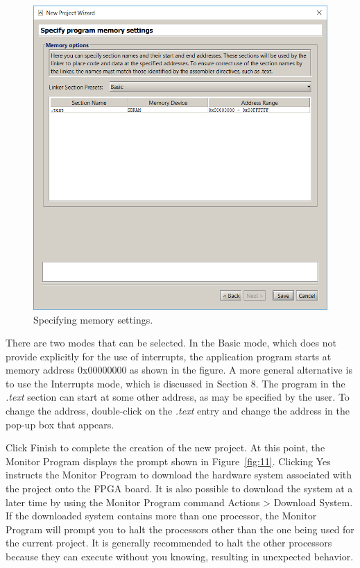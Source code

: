 \documentclass[11pt, twoside, pdftex]{article}
\begin{document}
\begin{enumerate}
\begin{figure}[H]
   \begin{center}
      \includegraphics[scale=0.5]{screenshots/figure10.png}
   \end{center}
   \caption{Specifying memory settings.} 
	 \label{fig:10}
\end{figure}

There are two modes that can be selected. In the {\sf Basic}
mode, which does not provide explicitly for the use of
interrupts, the application program starts at memory address
0x00000000 as shown in the figure. A more general alternative
is to use the {\sf Interrupts} mode, which is discussed in
Section 8.  
The program in the {\it .text} section can start 
at some other address, as may be specified by the user.
To change the address, double-click on the {\it .text} entry
and change the address in the pop-up box that appears.

Click {\sf Finish} to complete the creation of the new project.  At this point, the Monitor Program displays the prompt shown in
Figure~\ref{fig:11}. Clicking {\sf Yes} instructs the Monitor Program to
download the hardware system associated with the project onto 
the FPGA board. It is also possible to download the system 
at a later time by using the Monitor Program command
{\sf Actions > Download System}. 
If the downloaded system contains more than one processor,
the Monitor Program will prompt you to halt the processors other
than the one being used for the current project. It is generally
recommended to halt the other processors because they can execute
without you knowing, resulting in unexpected behavior.


\end{enumerate}
\end{document}
